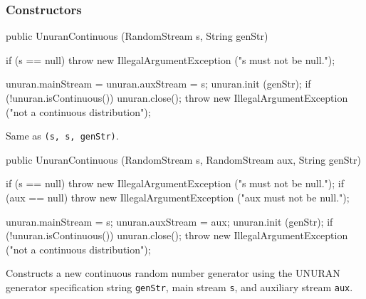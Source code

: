 \subsubsection* {Constructors}
\begin{code}

   public UnuranContinuous (RandomStream s, String genStr)\begin{hide} {
      if (s == null)
         throw new IllegalArgumentException ("s must not be null.");

      unuran.mainStream = unuran.auxStream = s;
      unuran.init (genStr);
      if (!unuran.isContinuous()) {
         unuran.close();
         throw new IllegalArgumentException ("not a continuous distribution");
      }
   }\end{hide}
\end{code}
\begin{tabb}   
  Same as \texttt{(s, s, genStr)}.
\end{tabb}
\begin{code}

   public UnuranContinuous (RandomStream s, RandomStream aux,
                            String genStr)\begin{hide} {
      if (s == null)
         throw new IllegalArgumentException ("s must not be null.");
      if (aux == null)
         throw new IllegalArgumentException ("aux must not be null.");

      unuran.mainStream = s;
      unuran.auxStream = aux;
      unuran.init (genStr);
      if (!unuran.isContinuous()) {
         unuran.close();
         throw new IllegalArgumentException ("not a continuous distribution");
      }
   }\end{hide}
\end{code}
\begin{tabb}
  Constructs a new continuous random number generator using
  the UNURAN generator specification string \texttt{genStr},
  main stream \texttt{s}, and auxiliary stream \texttt{aux}.
\end{tabb}


